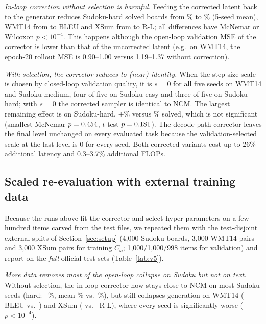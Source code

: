 \textit{In-loop correction without selection is harmful.} Feeding the corrected latent back to the generator reduces Sudoku-hard solved boards from \BaseHard\% to \LoopVoneHard\% (5-seed mean), WMT14 from \BaseWmt{} to \LoopVoneWmt{} BLEU and XSum from \BaseXsum{} to \LoopVoneXsum{} R-L; all differences have McNemar or Wilcoxon $p<10^{-4}$. This happens although the open-loop validation MSE of the corrector is lower than that of the uncorrected latent (e.g.\ on WMT14, the epoch-20 rollout MSE is 0.90--1.00 versus 1.19--1.37 without correction).

\textit{With selection, the corrector reduces to (near) identity.} When the step-size scale is chosen by closed-loop validation quality, it is $s=0$ for all five seeds on WMT14 and Sudoku-medium, four of five on Sudoku-easy and three of five on Sudoku-hard; with $s=0$ the corrected sampler is identical to NCM. The largest remaining effect is on Sudoku-hard, \LoopVtwoHard$\pm$\LoopVtwoHardStd\% versus \BaseHard\% solved, which is not significant (smallest McNemar $p=0.454$, $t$-test $p=0.181$). The decode-path corrector leaves the final level unchanged on every evaluated task because the validation-selected scale at the last level is $0$ for every seed. Both corrected variants cost up to 26\% additional latency and 0.3--3.7\% additional FLOPs.

\subsection{Scaled re-evaluation with external training data}
\label{sec:scaled}
Because the runs above fit the corrector and select hyper-parameters on a few hundred items carved from the test files, we repeated them with the test-disjoint external splits of Section~\ref{sec:setup} (4{,}000 Sudoku boards, 3{,}000 WMT14 pairs and 3{,}000 XSum pairs for training $C_\omega$; 1{,}000/1{,}000/998 items for validation) and report on the \emph{full} official test sets (Table~\ref{tab:v5}).



\textit{More data removes most of the open-loop collapse on Sudoku but not on text.} Without selection, the in-loop corrector now stays close to NCM on most Sudoku seeds (hard: \VfLoopHardMin--\VfLoopHardMax\%, mean \VfLoopHard\% vs.\ \VfBaseHard\%), but still collapses generation on WMT14 (\VfLoopWmtMin--\VfLoopWmtMax{} BLEU vs.\ \VfBaseWmt) and XSum (\VfLoopXsum{} vs.\ \VfBaseXsum{} R-L), where every seed is significantly worse ($p<10^{-4}$).

